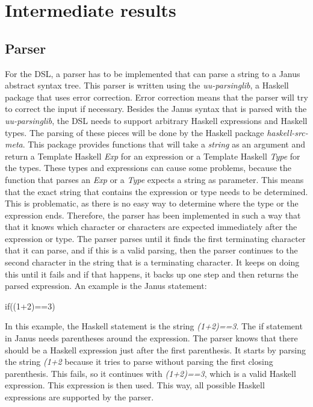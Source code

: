 \documentclass[12pt,a4paper]{article}
\begin{document}
\newpage

\section{Intermediate results}

\subsection{Parser}
For the DSL, a parser has to be implemented that can parse a string to a Janus abstract syntax tree. This parser is written using the \textit{uu-parsinglib}, a Haskell package that uses error correction. Error correction means that the parser will try to correct the input if necessary. Besides the Janus syntax that is parsed with the \textit{uu-parsinglib}, the DSL needs to support arbitrary Haskell expressions and Haskell types. The parsing of these pieces will be done by the Haskell package \textit{haskell-src-meta}. This package provides functions that will take a \textit{string} as an argument and return a Template Haskell \textit{Exp} for an expression or a Template Haskell \textit{Type} for the types. These types and expressions can cause some problems, because the function that parses an \textit{Exp} or a \textit{Type} expects a string as parameter. This means that the exact string that contains the expression or type needs to be determined. This is problematic, as there is no easy way to determine where the type or the expression ends. Therefore, the parser has been implemented in such a way that that it knows which character or characters are expected immediately after the expression or type. The parser parses until it finds the first terminating character that it can parse, and if this is a valid parsing, then the parser continues to the second character in the string that is a terminating character. It keeps on doing this until it fails and if that happens, it backs up one step and then returns the parsed expression. An example is the Janus statement:
    \begin{displayquote}
        if((1+2)==3)
    \end{displayquote}
In this example, the Haskell statement is the string \textit{(1+2)==3}. The if statement in Janus needs parentheses around the expression. The parser knows that there should be a Haskell expression just after the first parenthesis. It starts by parsing the string \textit{(1+2} because it tries to parse without parsing the first closing parenthesis. This fails, so it continues with \textit{(1+2)==3}, which is a valid Haskell expression. This expression is then used. This way, all possible Haskell expressions are supported by the parser.
\end{document}
